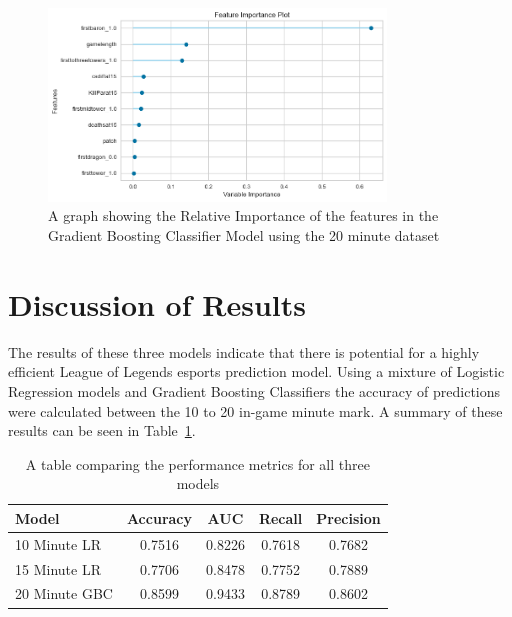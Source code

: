 \begin{figure}[h]
    \centering
    \includegraphics[width=0.8\textwidth]{figures/FeatureImport20}
    \caption{A graph showing the Relative Importance of the features in the Gradient Boosting Classifier Model using the 20 minute dataset}
    \label{fig:FeatureImport20}
\end{figure}


\section{Discussion of Results}\label{sec:discussion-of-results}

The results of these three models indicate that there is potential for a highly efficient League of Legends esports prediction model.
Using a mixture of Logistic Regression models and Gradient Boosting Classifiers the accuracy of predictions were calculated between the 10 to 20 in-game minute mark.
A summary of these results can be seen in Table~\ref{tab:ModelCompare}. \\

\begin{table}[h]
    \centering
    \begin{tabular}{lcccc}
        \toprule
        \textbf{Model} & \textbf{Accuracy} & \textbf{AUC} & \textbf{Recall} & \textbf{Precision} \\
        \midrule
        10 Minute LR & 0.7516 & 0.8226 & 0.7618 & 0.7682 \\
        15 Minute LR & 0.7706 & 0.8478 & 0.7752 & 0.7889 \\
        20 Minute GBC & 0.8599 & 0.9433 & 0.8789 & 0.8602 \\
        \bottomrule
    \end{tabular}
    \caption{A table comparing the performance metrics for all three models}
    \label{tab:ModelCompare}
\end{table}

